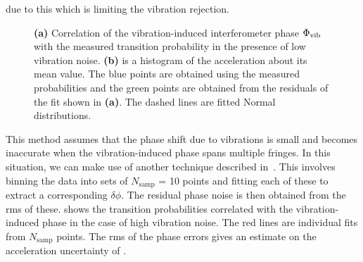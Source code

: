due to this which is limiting the vibration
rejection.\nocite{Macdonald1992} 
\begin{figure}[htpb!]
  \centering
  \caption[MEMS/Interferometer correlation in a
    low vibration
    environment.]{\textbf{(a)} Correlation of the vibration-induced interferometer
    phase $\Phi_\textnormal{vib}$ with the measured transition
    probability in the presence of low vibration noise. \textbf{(b)}
    is a histogram of the acceleration about its mean value. The blue
    points are obtained using the measured probabilities and the green
    points are obtained from the residuals of the fit shown in
    \textbf{(a)}. The dashed lines are fitted Normal distributions.}
  \label{fig:vib_comparison}
\end{figure}
\par\noindent
This method assumes that the phase shift due to vibrations is small
and becomes inaccurate when the vibration-induced phase spans multiple
fringes. In this situation, we can make use of another technique
described in~\cite{Merlet2009}. This involves binning the data into
sets of $N_\text{samp}$ = 10 points and fitting each of these to
extract a corresponding $\delta \phi$. The residual phase noise is
then obtained from the rms of these.  shows
the transition probabilities correlated with the vibration-induced
phase in the case of high vibration noise. The red lines are
individual fits from $N_\text{samp}$ points. The rms of the phase
errors gives an
estimate on the acceleration uncertainty of
.  

